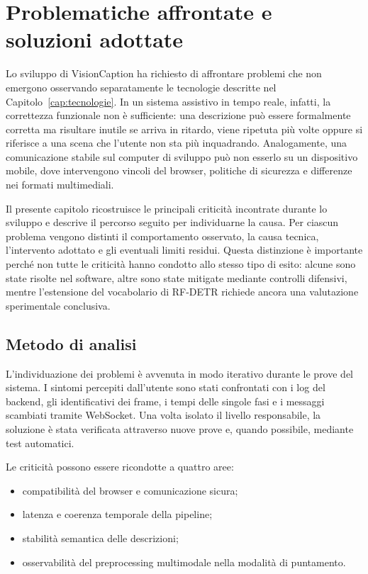 \chapter{Problematiche affrontate e soluzioni adottate}
\label{cap:problematiche}

Lo sviluppo di VisionCaption ha richiesto di affrontare problemi che non
emergono osservando separatamente le tecnologie descritte nel
Capitolo~\ref{cap:tecnologie}. In un sistema assistivo in tempo reale, infatti,
la correttezza funzionale non è sufficiente: una descrizione può essere
formalmente corretta ma risultare inutile se arriva in ritardo, viene ripetuta
più volte oppure si riferisce a una scena che l'utente non sta più
inquadrando. Analogamente, una comunicazione stabile sul computer di sviluppo
può non esserlo su un dispositivo mobile, dove intervengono vincoli del
browser, politiche di sicurezza e differenze nei formati multimediali.

Il presente capitolo ricostruisce le principali criticità incontrate durante
lo sviluppo e descrive il percorso seguito per individuarne la causa. Per
ciascun problema vengono distinti il comportamento osservato, la causa
tecnica, l'intervento adottato e gli eventuali limiti residui. Questa
distinzione è importante perché non tutte le criticità hanno condotto allo
stesso tipo di esito: alcune sono state risolte nel software, altre sono state
mitigate mediante controlli difensivi, mentre l'estensione del vocabolario di
RF-DETR richiede ancora una valutazione sperimentale conclusiva.

\section{Metodo di analisi}
\label{sec:problemi-metodo}

L'individuazione dei problemi è avvenuta in modo iterativo durante le prove
del sistema. I sintomi percepiti dall'utente sono stati confrontati con i log
del backend, gli identificativi dei frame, i tempi delle singole fasi e i
messaggi scambiati tramite WebSocket. Una volta isolato il livello
responsabile, la soluzione è stata verificata attraverso nuove prove e,
quando possibile, mediante test automatici.

Le criticità possono essere ricondotte a quattro aree:

\begin{itemize}
    \item compatibilità del browser e comunicazione sicura;
    \item latenza e coerenza temporale della pipeline;
    \item stabilità semantica delle descrizioni;
    \item osservabilità del preprocessing multimodale nella modalità di
    puntamento.
\end{itemize}

